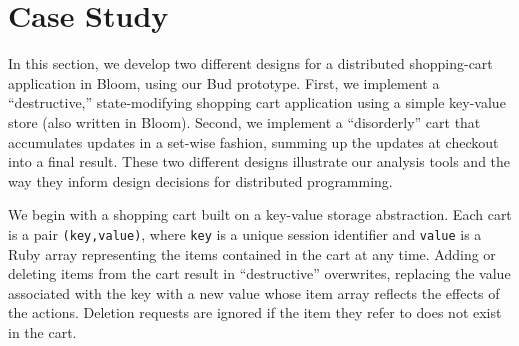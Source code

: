 \section{Case Study}
\label{sec:case}

In this section, we develop two different designs for a distributed shopping-cart
application in Bloom, using our Bud prototype.  First, we implement a ``destructive,'' state-modifying
shopping cart application using a simple key-value store (also written in Bloom).
Second, we implement a ``disorderly'' cart that accumulates updates in a 
set-wise fashion, summing up the updates at checkout into a final result.  These two different designs illustrate our analysis tools and the way they inform design decisions for distributed programming.

We begin with a shopping cart built on a key-value storage abstraction.  Each
cart is a pair \texttt{(key,value)}, where \texttt{key} is a unique session
identifier and \texttt{value} is 
a Ruby array representing the items contained in the cart
at any time. Adding or deleting items from the cart result in ``destructive''
overwrites, replacing the value associated with the key with a new value whose
item array reflects the effects of the actions.  Deletion requests are ignored
if the item they refer to does not exist in the cart.

